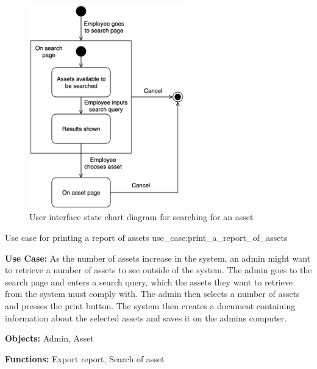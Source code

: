 \begin{figure}[H]
    \centering
    \includegraphics[width=0.6\textwidth]{figures/UC_Search_asset.png}
    \caption{User interface state chart diagram for searching for an asset}
    \label{fig:search_asset_statechart}
\end{figure}

\newpage

    {Use case for printing a report of assets}
    {use_case:print_a_report_of_assets}
    {
        \textbf{Use Case:} As the number of assets increase in the system, an admin might want to retrieve a number of assets to see outside of the system. The admin goes to the search page and enters a search query, which the assets they want to retrieve from the system must comply with. The admin then selects a number of assets and presses the print button. The system then creates a document containing information about the selected assets and saves it on the admins computer.
    
        \vskip 0.2cm
        
        \textbf{Objects:} Admin, Asset
        
        \vskip 0.2cm
        
        \textbf{Functions:} Export report, Search of asset
    }

